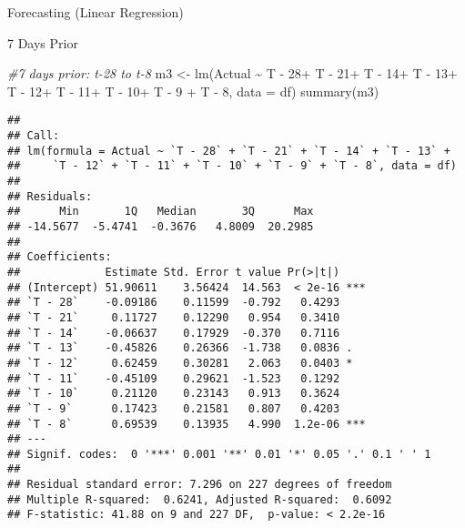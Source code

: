 \documentclass[
  ignorenonframetext,
]{beamer}
\newenvironment{Shaded}{\begin{snugshade}}{\end{snugshade}}
\newcommand{\AttributeTok}[1]{\textcolor[rgb]{0.77,0.63,0.00}{#1}}
\newcommand{\CommentTok}[1]{\textcolor[rgb]{0.56,0.35,0.01}{\textit{#1}}}
\newcommand{\FunctionTok}[1]{\textcolor[rgb]{0.00,0.00,0.00}{#1}}
\newcommand{\NormalTok}[1]{#1}
\newcommand{\OtherTok}[1]{\textcolor[rgb]{0.56,0.35,0.01}{#1}}
\newcommand{\SpecialCharTok}[1]{\textcolor[rgb]{0.00,0.00,0.00}{#1}}
\newcommand{\StringTok}[1]{\textcolor[rgb]{0.31,0.60,0.02}{#1}}
\begin{document}
\begin{frame}[fragile]{Forecasting (Linear Regression)}
\begin{block}{7 Days Prior}
\protect\hypertarget{days-prior-1}{}
\begin{Shaded}
\begin{Highlighting}[]
\CommentTok{\#7 days prior: t{-}28 to t{-}8}
\NormalTok{m3 }\OtherTok{\textless{}{-}} \FunctionTok{lm}\NormalTok{(Actual }\SpecialCharTok{\textasciitilde{}} \StringTok{\textasciigrave{}}\AttributeTok{T {-} 28}\StringTok{\textasciigrave{}}\SpecialCharTok{+}
                  \StringTok{\textasciigrave{}}\AttributeTok{T {-} 21}\StringTok{\textasciigrave{}}\SpecialCharTok{+}
                  \StringTok{\textasciigrave{}}\AttributeTok{T {-} 14}\StringTok{\textasciigrave{}}\SpecialCharTok{+}
                  \StringTok{\textasciigrave{}}\AttributeTok{T {-} 13}\StringTok{\textasciigrave{}}\SpecialCharTok{+}
                  \StringTok{\textasciigrave{}}\AttributeTok{T {-} 12}\StringTok{\textasciigrave{}}\SpecialCharTok{+}
                  \StringTok{\textasciigrave{}}\AttributeTok{T {-} 11}\StringTok{\textasciigrave{}}\SpecialCharTok{+}
                  \StringTok{\textasciigrave{}}\AttributeTok{T {-} 10}\StringTok{\textasciigrave{}}\SpecialCharTok{+}
                  \StringTok{\textasciigrave{}}\AttributeTok{T {-} 9}\StringTok{\textasciigrave{}} \SpecialCharTok{+}
                  \StringTok{\textasciigrave{}}\AttributeTok{T {-} 8}\StringTok{\textasciigrave{}}\NormalTok{,}
         \AttributeTok{data =}\NormalTok{ df)}
\FunctionTok{summary}\NormalTok{(m3)}
\end{Highlighting}
\end{Shaded}

\begin{verbatim}
## 
## Call:
## lm(formula = Actual ~ `T - 28` + `T - 21` + `T - 14` + `T - 13` + 
##     `T - 12` + `T - 11` + `T - 10` + `T - 9` + `T - 8`, data = df)
## 
## Residuals:
##      Min       1Q   Median       3Q      Max 
## -14.5677  -5.4741  -0.3676   4.8009  20.2985 
## 
## Coefficients:
##             Estimate Std. Error t value Pr(>|t|)    
## (Intercept) 51.90611    3.56424  14.563  < 2e-16 ***
## `T - 28`    -0.09186    0.11599  -0.792   0.4293    
## `T - 21`     0.11727    0.12290   0.954   0.3410    
## `T - 14`    -0.06637    0.17929  -0.370   0.7116    
## `T - 13`    -0.45826    0.26366  -1.738   0.0836 .  
## `T - 12`     0.62459    0.30281   2.063   0.0403 *  
## `T - 11`    -0.45109    0.29621  -1.523   0.1292    
## `T - 10`     0.21120    0.23143   0.913   0.3624    
## `T - 9`      0.17423    0.21581   0.807   0.4203    
## `T - 8`      0.69539    0.13935   4.990  1.2e-06 ***
## ---
## Signif. codes:  0 '***' 0.001 '**' 0.01 '*' 0.05 '.' 0.1 ' ' 1
## 
## Residual standard error: 7.296 on 227 degrees of freedom
## Multiple R-squared:  0.6241, Adjusted R-squared:  0.6092 
## F-statistic: 41.88 on 9 and 227 DF,  p-value: < 2.2e-16
\end{verbatim}
\end{block}


\end{frame}
\end{document}
